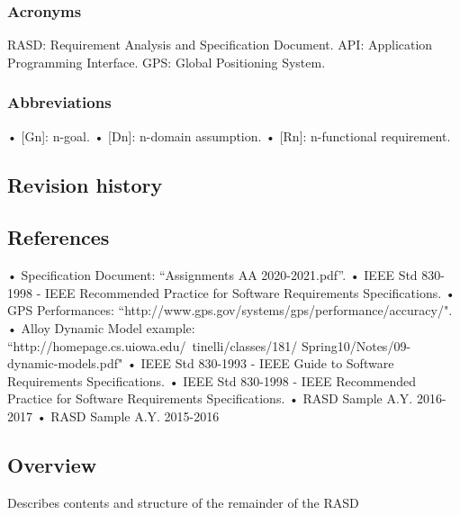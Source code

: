 \subsubsection{Acronyms}
\label{subsect:acronyms}
RASD: Requirement Analysis and Specification Document.
API: Application Programming Interface.
GPS: Global Positioning System.

\subsubsection{Abbreviations}
\label{subsect:abbreviations}
• [Gn]: n-goal.
• [Dn]: n-domain assumption.
• [Rn]: n-functional requirement.


\subsection{Revision history}
\label{subsect:revisionhistory}

\subsection{References}
\label{subsect:references}
• Specification Document: “Assignments AA 2020-2021.pdf”.
• IEEE Std 830-1998 - IEEE Recommended Practice for Software Requirements Specifications.
• GPS Performances: “http://www.gps.gov/systems/gps/performance/accuracy/".
• Alloy Dynamic Model example: “http://homepage.cs.uiowa.edu/~tinelli/classes/181/
Spring10/Notes/09-dynamic-models.pdf"
• IEEE Std 830-1993 - IEEE Guide to Software Requirements Specifications.
• IEEE Std 830-1998 - IEEE Recommended Practice for Software Requirements Specifications.
• RASD Sample A.Y. 2016-2017
• RASD Sample A.Y. 2015-2016


\subsection{Overview}
\label{subsect:overview}

Describes contents and structure of the remainder of the RASD